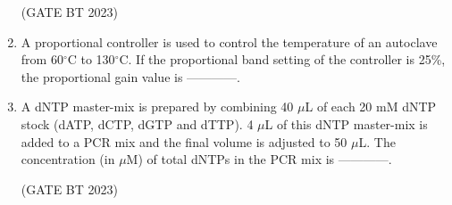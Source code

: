 \documentclass[journal,12pt,onecolumn]{IEEEtran}
\begin{document}
\begin{enumerate}
    \hfill(GATE BT 2023)

    \item A proportional controller is used to control the temperature of an autoclave from 60$^\circ$C to 130$^\circ$C. If the proportional band setting of the controller is 25\%, the proportional gain value is ------------.

    

    \item A dNTP master-mix is prepared by combining 40 $\mu$L of each 20 mM dNTP stock (dATP, dCTP, dGTP and dTTP). 4 $\mu$L of this dNTP master-mix is added to a PCR mix and the final volume is adjusted to 50 $\mu$L. The concentration (in $\mu$M) of total dNTPs in the PCR mix is ------------.

    \hfill(GATE BT 2023)

\end{enumerate}
\end{document}
